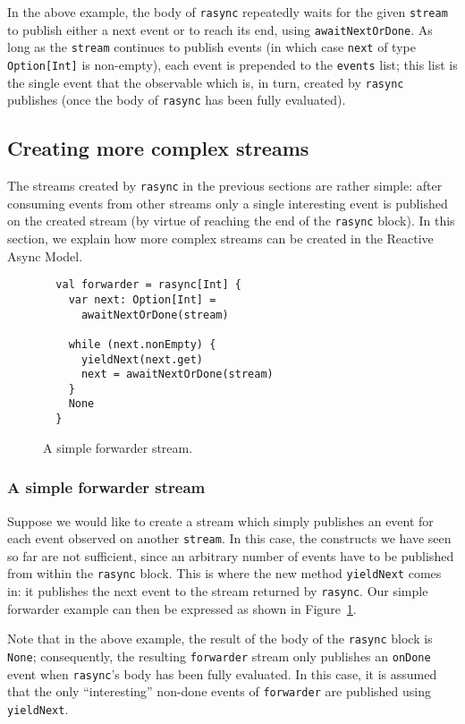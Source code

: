 \documentclass{acm_proc_article-sp}
\begin{document}
In the above example, the body of \verb|rasync| repeatedly waits for the given
\verb|stream| to publish either a next event or to reach its end, using
\verb|awaitNextOrDone|. As long as the \verb|stream| continues to publish
events (in which case \verb|next| of type \verb|Option[Int]| is non-empty),
each event is prepended to the \verb|events| list; this list is the single
event that the observable which is, in turn, created by \verb|rasync|
publishes (once the body of \verb|rasync| has been fully evaluated).


\subsection{Creating more complex streams}

The streams created by \verb|rasync| in the previous sections are rather
simple: after consuming events from other streams only a single interesting
event is published on the created stream (by virtue of reaching the end of the
\verb|rasync| block). In this section, we explain how more complex streams can
be created in the Reactive Async Model.

\begin{figure}[ht!]
  \centering
  \begin{lstlisting}
  val forwarder = rasync[Int] {
    var next: Option[Int] =
      awaitNextOrDone(stream)

    while (next.nonEmpty) {
      yieldNext(next.get)
      next = awaitNextOrDone(stream)
    }
    None
  }
  \end{lstlisting}
  \caption{A simple forwarder stream.}
  \label{fig:forwarder}
\end{figure}

\subsubsection{A simple forwarder stream}

Suppose we would like to create a stream which simply publishes an event for
each event observed on another \verb|stream|. In this case, the constructs we
have seen so far are not sufficient, since an arbitrary number of events have
to be published from within the \verb|rasync| block. This is where the new
method \verb|yieldNext| comes in: it publishes the next event to the stream
returned by \verb|rasync|. Our simple forwarder example can then be expressed
as shown in Figure~\ref{fig:forwarder}.

Note that in the above example, the result of the body of the \verb|rasync|
block is \verb|None|; consequently, the resulting \verb|forwarder| stream only
publishes an \verb|onDone| event when \verb|rasync|'s body has been fully
evaluated. In this case, it is assumed that the only ``interesting'' non-done
events of \verb|forwarder| are published using \verb|yieldNext|.
\end{document}
